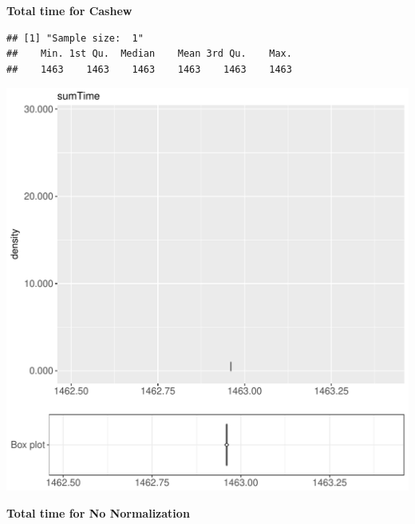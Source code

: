 \documentclass{article}\usepackage[]{graphicx}\usepackage[]{color}
\makeatletter
\def\maxwidth{ %
  \ifdim\Gin@nat@width>\linewidth
    \linewidth
  \else
    \Gin@nat@width
  \fi
}
\newenvironment{kframe}{%
 \def\at@end@of@kframe{}%
 \ifinner\ifhmode%
  \def\at@end@of@kframe{\end{minipage}}%
  \begin{minipage}{\columnwidth}%
 \fi\fi%
 \def\FrameCommand##1{\hskip\@totalleftmargin \hskip-\fboxsep
 \colorbox{shadecolor}{##1}\hskip-\fboxsep
     \hskip-\linewidth \hskip-\@totalleftmargin \hskip\columnwidth}%
 \MakeFramed {\advance\hsize-\width
   \@totalleftmargin\z@ \linewidth\hsize
   \@setminipage}}%
 {\par\unskip\endMakeFramed%
 \at@end@of@kframe}
\newenvironment{knitrout}{}{} %
\makeatother
\begin{document}
 \textbf{Total time for Cashew}
\begin{knitrout}
\color{fgcolor}\begin{kframe}
\begin{verbatim}
## [1] "Sample size:  1"
##    Min. 1st Qu.  Median    Mean 3rd Qu.    Max. 
##    1463    1463    1463    1463    1463    1463
\end{verbatim}


{\ttfamily\noindent\bfseries{}}\end{kframe}
\includegraphics[width=\maxwidth]{figure/RH2_cashew_obscure-1} 

\end{knitrout}
 \textbf{Total time for No Normalization}
\end{document}
